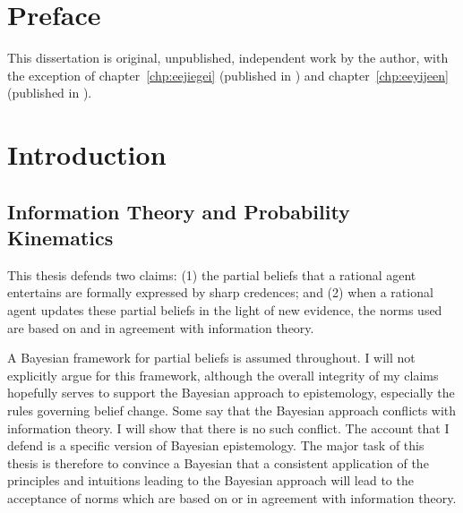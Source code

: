 \documentclass[phd,12pt,oneside]{ubcthesis}
\begin{document}
\chapter{Preface}
\label{chp:aingiepo}

This dissertation is original, unpublished, independent work by the
author, with the exception of chapter~\ref{chp:eejiegei} (published in
) and chapter~\ref{chp:eeyijeen} (published in
).

\tableofcontents

\listoffigures


\mainmatter

\chapter{Introduction}
\label{chp:cahxahmu}

\section{Information Theory and Probability Kinematics}
\label{sec:aineichu}

This thesis defends two claims: (1) the partial beliefs that a
rational agent entertains are formally expressed by sharp credences;
and (2) when a rational agent updates these partial beliefs in the
light of new evidence, the norms used are based on and in agreement
with information theory. 

A Bayesian framework for partial beliefs is assumed throughout. I will
not explicitly argue for this framework, although the overall
integrity of my claims hopefully serves to support the Bayesian
approach to epistemology, especially the rules governing belief
change. Some say that the Bayesian approach conflicts with information
theory. I will show that there is no such conflict. The account that I
defend is a specific version of Bayesian epistemology. The major task
of this thesis is therefore to convince a Bayesian that a consistent
application of the principles and intuitions leading to the Bayesian
approach will lead to the acceptance of norms which are based on or in
agreement with information theory.
\end{document}
